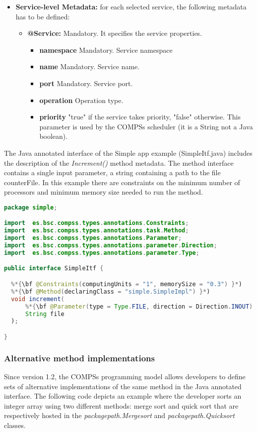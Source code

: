 \begin{itemize}
 \item \textbf{Service-level Metadata:} for each selected service, the following metadata has to be defined:
       \begin{itemize}
         \item \textbf{@Service:} Mandatory. It specifies the service properties. 
		\begin{itemize}
			\item \textbf{namespace} Mandatory. Service namespace
			\item \textbf{name} Mandatory. Service name.
			\item \textbf{port} Mandatory. Service port.
			\item \textbf{operation} Operation type. 
			\item \textbf{priority} "true" if the service takes priority, "false" otherwise. This parameter is 
			used by the COMPSs scheduler (it is a String not a Java boolean). 
		\end{itemize}
	\end{itemize}
\end{itemize}

    
The Java annotated interface of the Simple app example (SimpleItf.java) includes the description of the {\it Increment()} method metadata.
The method interface contains a single input parameter, a string containing a path to the file counterFile. In this example
there are constraints on the minimum number of processors and minimum memory size needed to run the
method.

\begin{lstlisting}[language=java]
package simple;

import  es.bsc.compss.types.annotations.Constraints;
import  es.bsc.compss.types.annotations.task.Method;
import  es.bsc.compss.types.annotations.Parameter;
import  es.bsc.compss.types.annotations.parameter.Direction;
import  es.bsc.compss.types.annotations.parameter.Type;

public interface SimpleItf {

  %*{\bf @Constraints(computingUnits = "1", memorySize = "0.3") }*)
  %*{\bf @Method(declaringClass = "simple.SimpleImpl") }*)
  void increment(
      %*{\bf @Parameter(type = Type.FILE, direction = Direction.INOUT) }*)
      String file
  );

}
\end{lstlisting}


\subsubsection{Alternative method implementations}
Since version 1.2, the COMPSs programming model allows developers to define sets of alternative implementations of the same method in 
the Java annotated interface. 
The following code depicts an example where the developer sorts an integer array using two different
methods: merge sort and quick sort that are respectively hosted in the {\it packagepath.Mergesort} and
{\it packagepath.Quicksort} classes.

